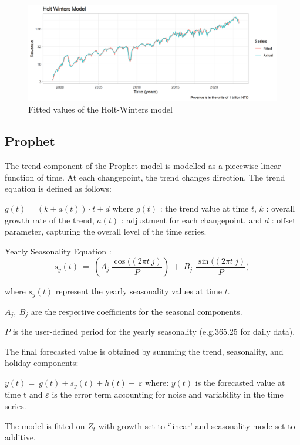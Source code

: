 \documentclass[
]{article}
\begin{document}
\begin{figure}
\centering
\includegraphics{Plots/fittedhwaddplot.png}
\caption{Fitted values of the Holt-Winters model}
\end{figure}

\hypertarget{prophet-1}{%
\subsection{Prophet}\label{prophet-1}}

The trend component of the Prophet model is modelled as a piecewise
linear function of time. At each changepoint, the trend changes
direction. The trend equation is defined as follows:

\(g(t) = (k + a(t)) \cdot t + d\) where \(g(t)\) : the trend value at
time \(t\), \(k\) : overall growth rate of the trend, \(a(t)\) :
adjustment for each changepoint, and \(d\) : offset parameter, capturing
the overall level of the time series.

Yearly Seasonality Equation :
\[s_{y}(t)\ = \ (A_{j}\ \frac{\cos((2\pi t\ j)}{P})\ + \ B_{j\ }\ \frac{\sin((2\pi t\ j)}{P})\ \]

where \(s_y(t)\) represent the yearly seasonality values at time \(t\).

\(A_{j},\ B_{j}\) are the respective coefficients for the seasonal
components.

\(P\) is the user-defined period for the yearly seasonality (e.g.365.25
for daily data).

The final forecasted value is obtained by summing the trend,
seasonality, and holiday components:

\(y(t) = \ g(t) + s_{y}(t) + h(t) + \ \varepsilon\) where: \(y(t)\) is
the forecasted value at time t and \(\varepsilon\) is the error term
accounting for noise and variability in the time series.

The model is fitted on \(Z_{t}\) with growth set to `linear' and
seasonality mode set to additive.
\end{document}
